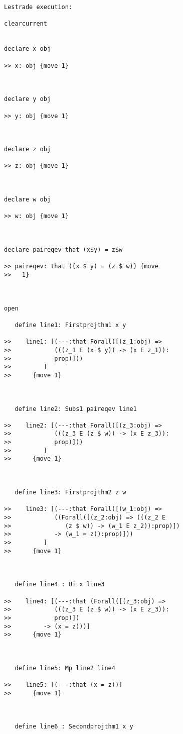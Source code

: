 \documentclass[12pt]{article}
\begin{document}
\begin{verbatim}Lestrade execution:

clearcurrent


declare x obj

>> x: obj {move 1}



declare y obj

>> y: obj {move 1}



declare z obj

>> z: obj {move 1}



declare w obj

>> w: obj {move 1}



declare paireqev that (x$y) = z$w

>> paireqev: that ((x $ y) = (z $ w)) {move
>>   1}



open

   define line1: Firstprojthm1 x y

>>    line1: [(---:that Forall([(z_1:obj) =>
>>            (((z_1 E (x $ y)) -> (x E z_1)):
>>            prop)]))
>>         ]
>>      {move 1}



   define line2: Subs1 paireqev line1

>>    line2: [(---:that Forall([(z_3:obj) =>
>>            (((z_3 E (z $ w)) -> (x E z_3)):
>>            prop)]))
>>         ]
>>      {move 1}



   define line3: Firstprojthm2 z w

>>    line3: [(---:that Forall([(w_1:obj) =>
>>            ((Forall([(z_2:obj) => (((z_2 E
>>               (z $ w)) -> (w_1 E z_2)):prop)])
>>            -> (w_1 = z)):prop)]))
>>         ]
>>      {move 1}



   define line4 : Ui x line3

>>    line4: [(---:that (Forall([(z_3:obj) =>
>>            (((z_3 E (z $ w)) -> (x E z_3)):
>>            prop)])
>>         -> (x = z)))]
>>      {move 1}



   define line5: Mp line2 line4

>>    line5: [(---:that (x = z))]
>>      {move 1}



   define line6 : Secondprojthm1 x y


\end{verbatim}
\end{document}
